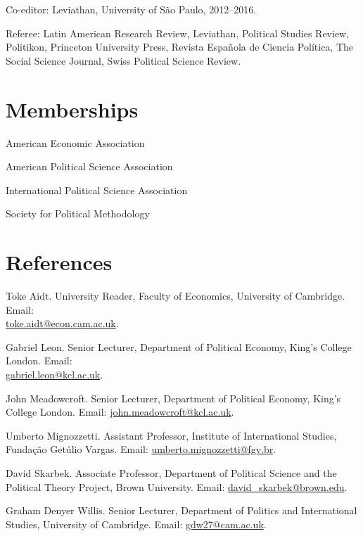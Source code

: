 \documentclass[a4paper]{article}
\renewenvironment{itemize}{
	\begin{list}{}{
			\setlength{\leftmargin}{1.5em}
		}
		}{
	\end{list}
}
\begin{document}
	\begin{itemize}
		\item Co-editor: Leviathan, University of São Paulo, 2012--2016.
		\item Referee: Latin American Research Review, Leviathan, Political Studies Review, Politikon,
		Princeton University Press, Revista Española de Ciencia Política, The Social Science Journal, Swiss
		Political Science Review.
	\end{itemize}

	\section*{Memberships}

	\begin{itemize}
		\item American Economic Association
		\item American Political Science Association
		\item International Political Science Association
		\item Society for Political Methodology
	\end{itemize}

	\section*{References}

	\begin{itemize}

		\item Toke Aidt. University Reader, Faculty of Economics, University of Cambridge. Email: \\ \href{mailto:toke.aidt@econ.cam.ac.uk}{toke.aidt@econ.cam.ac.uk}.
		\item Gabriel Leon. Senior Lecturer, Department of Political Economy, King's College London. Email: \\ \href{mailto:gabriel.leon@kcl.ac.uk}{gabriel.leon@kcl.ac.uk}.
		\item John Meadowcroft. Senior Lecturer, Department of Political Economy, King's College London. Email: \href{mailto:john.meadowcroft@kcl.ac.uk}{john.meadowcroft@kcl.ac.uk}.
		\item Umberto Mignozzetti. Assistant Professor, Institute of International Studies, Funda\c{c}\~{a}o Get\'{u}lio Vargas. Email: \href{umberto.mignozzetti@fgv.br}{umberto.mignozzetti@fgv.br}.
		\item David Skarbek. Associate Professor, Department of Political Science and the Political Theory Project, Brown University. Email: \href{mailto:davidskarbek@gmail.com}{david\_skarbek@brown.edu}.
		\item Graham Denyer Willis. Senior Lecturer, Department of Politics and International Studies, University of Cambridge. Email: \href{mailto:gdw27@cam.ac.uk}{gdw27@cam.ac.uk}.
	\end{itemize}

	\bigskip


	
\end{document}
